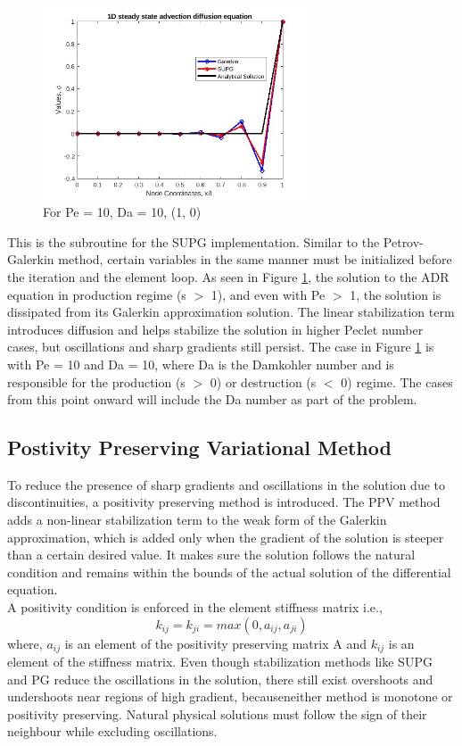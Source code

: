 \documentclass[12pt, oneside]{article}
\begin{document}
\begin{figure}[!h]
\centering
 \includegraphics[width=0.7\textwidth]{pe_10_da_10_supg_1_0.jpg}
 \caption{For Pe = 10, Da = 10, (1, 0)}
 \label{pe_10_da_10_1_0_supg}
\end{figure}
This is the subroutine for the SUPG implementation. Similar to the Petrov-Galerkin method, certain variables in the same manner must be initialized before the iteration and the element loop. As seen in Figure \ref{pe_10_da_10_1_0_supg}, the solution to the ADR equation in production regime (s $>$ 1), and even with Pe $>$ 1, the solution is dissipated from its Galerkin approximation solution. The linear stabilization term introduces diffusion and helps stabilize the solution in higher Peclet number cases, but oscillations and sharp gradients still persist. The case in Figure \ref{pe_10_da_10_1_0_supg} is with Pe = 10 and Da = 10, where Da is the Damkohler number and is responsible for the production (s $>$ 0) or destruction (s $<$ 0) regime. The cases from this point onward will include the Da number as part of the problem.
\subsection{Postivity Preserving Variational Method}
To reduce the presence of sharp gradients and oscillations in the solution due to discontinuities, a positivity preserving method is introduced. The PPV method adds a non-linear stabilization term to the weak form of the Galerkin approximation, which is added only when the gradient of the solution is steeper than a certain desired value. It makes sure the solution follows the natural condition and remains within the bounds of the actual solution of the differential equation. \\
A positivity condition is enforced in the element stiffness matrix i.e.,
   \begin{equation}
       k_{ij} = k_{ji} = max(0, a_{ij}, a_{ji})
 \end{equation}
 where, $a_{ij}$ is an element of the positivity preserving matrix A and $k_{ij}$ is an element of the stiffness matrix. Even though stabilization methods like SUPG and PG reduce the oscillations in the solution, there still exist overshoots and undershoots near regions of high gradient, becauseneither method is monotone or positivity preserving. Natural physical solutions must follow the sign of their neighbour while excluding oscillations. 
\end{document}
